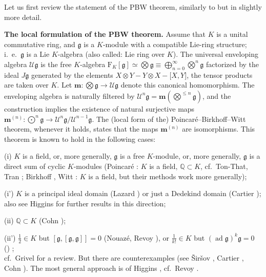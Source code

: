 \documentclass[11pt,a4paper]{amsart}
\DeclareMathOperator{\ad}{ad}
\newcommand{\bo}{\boldsymbol}
\newcommand{\botimes}{{\textstyle\bigotimes}}
\newcommand{\bodot}{{\textstyle\bigodot}}
\theoremstyle{definition}
\theoremstyle{plain}
\begin{document}
Let us first review the statement of the PBW theorem, similarly to \cite{LLX} but in slightly more detail.

\textbf{The local formulation of the PBW theorem.}
Assume that $K$ is a unital commutative ring, and $\mathfrak g$ is a $K$-module with a compatible Lie-ring structure;
 i.~e.~$\mathfrak g$ is a Lie $K$-algebra (also called: Lie ring over $K$).
The universal enveloping algebra $\mathcal U\mathfrak g$ is the free $K$-algebra
 $\mathrm F_K[\mathfrak g]\simeq \bigotimes\mathfrak g\equiv \bigoplus_{n=0}^\infty\botimes^n\mathfrak g$
 factorized by the ideal $J\mathfrak g$ generated by the
 elements $X\otimes Y-Y\otimes X-\boldsymbol[X,Y\boldsymbol]$, the tensor products are taken over $K$.
Let $\boldsymbol m:\bigotimes\mathfrak g\rightarrow\mathcal U\mathfrak g$ denote this canonical homomorphism.
The enveloping algebra is naturally filtered by $\mathcal U^n\mathfrak g=\bo m\left(\botimes^{\leq n}\mathfrak g\right)$, and the
 construction implies the existence of natural surjective maps
 $\bo m^{(n)}: \bodot^n\mathfrak g\rightarrow \mathcal U^n\mathfrak g/\mathcal U^{n-1}\mathfrak g$.
The (local form of the) Poincar\'e--Birkhoff--Witt theorem, whenever it holds, states  that the maps $\bo m^{(n)}$ are isomorphisms.
This theorem is known to hold in the following cases:

(i) $K$ is a field, or, more generally,  $\mathfrak g$ is a free $K$-module, or,
 more generally, $\mathfrak g$ is a direct sum of cyclic $K$-modules
 (Poincar\'e \cite{P}: $K$ is a field, $\mathbb Q\subset K$, cf.~Ton-That, Tran \cite{TT};
 Birkhoff \cite{B}, Witt \cite{W}: $K$ is a field, but their methods work more generally);


(i') $K$ is a principal ideal domain (Lazard \cite{L}) or just a Dedekind domain (Cartier \cite{C});
 also see Higgins \cite{H} for further results in this direction;

(ii) $\mathbb Q\subset K$ (Cohn \cite{CC});

(ii') $\frac12\in K$ but $[\mathfrak g,[\mathfrak g,\mathfrak g]]=0$ (Nouaz\'e, Revoy \cite{NR}),
or  $\frac1{k!}\in K$ but $(\ad\mathfrak g)^{k}\mathfrak g=0$ (\cite{LLX}) ;
\\
cf.~Grivel \cite{G} for a review. But there are counterexamples
 (see \v{S}ir\v{s}ov \cite{S1}, Cartier \cite{C}, Cohn \cite{CC}).
The most general approach is of Higgins \cite{H}, cf.~Revoy \cite{Re}.

\end{document}
